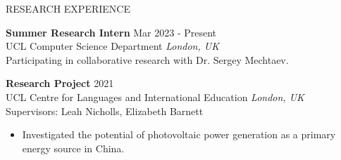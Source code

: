 \documentclass{resume} %
\begin{document}
\begin{rSection}{RESEARCH EXPERIENCE}

\textbf{Summer Research Intern} \hfill Mar 2023 - Present\\
UCL Computer Science Department \hfill \textit{London, UK}\\
Participating in collaborative research with Dr. Sergey Mechtaev.

\textbf{Research Project} \hfill 2021\\
UCL Centre for Languages and International Education \hfill \textit{London, UK}\\
Supervisors: Leah Nicholls, Elizabeth Barnett
\begin{itemize}
    \itemsep -3pt {} 
    \item Investigated the potential of photovoltaic power generation as a primary energy source in China.
\end{itemize}

\end{rSection}
\end{document}
